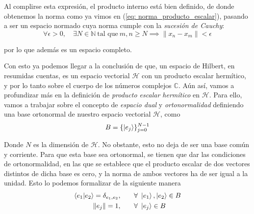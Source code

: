 \documentclass{article}
\numberwithin{equation}{section} %
\begin{document}
    \vspace{1.5mm}

    Al complirse esta expresión, el producto interno está bien definido, de donde obtenemos la norma como ya vimos en (\ref{eq: norma_producto_escalar}), pasando a ser un espacio normado cuya norma cumple con la \textit{sucesión de Cauchy}:
    \begin{equation*}
        \forall \epsilon > 0, \quad \exists N \in \mathbb{N} \ \text{tal que} \ m, n \geq N \implies \| x_{n} - x_{m} \| < \epsilon
    \end{equation*}
    
    \vspace{1.5mm}

    por lo que además es un espacio completo.

    \vspace{5mm}

    Con esto ya podemos llegar a la conclusión de que, un espacio de Hilbert, en resumidas cuentas, es un espacio vectorial \( \mathcal{H} \) con un producto escalar hermítico, y por lo tanto sobre el cuerpo de los números complejos \( \mathbb{C} \). Aún así, vamos a profundizar más en la definición de \textit{producto escalar hermítico} en \( \mathcal{H} \). Para ello, vamos a trabajar sobre el concepto de \textit{espacio dual} y \textit{ortonormalidad} definiendo una base ortonormal de nuestro espacio vectorial \( \mathcal{H} \), como
    \begin{equation}
        B = \{ \ket{e_{j}} \} _{j = 0}^{N - 1}
        \label{eq: base_ortonormal_H}
    \end{equation}

    \vspace{1.5mm}

    Donde \( N \) es la dimensión de \( \mathcal{H} \). No obstante, esto no deja de ser una base común y corriente. Para que esta base sea ortonormal, se tienen que dar las condiciones de ortonormalidad, en las que se establece que el producto escalar de dos vectores distintos de dicha base es cero, y la norma de ambos vectores ha de ser igual a la unidad. Esto lo podemos formalizar de la siguiente manera
    \begin{align}
        \braket{e_{1} | e_{2}} = \delta_{e_{1}, e_{2}}, \qquad &\forall \ \ket{e_{1}}, \ket{e_{2}} \in B \label{eq: ortonormalidad} \\
        \| e_{j} \| = 1,  \qquad &\forall \ \ket{e_{j}} \in B \label{eq: linealidad}
    \end{align}
    
\end{document}
